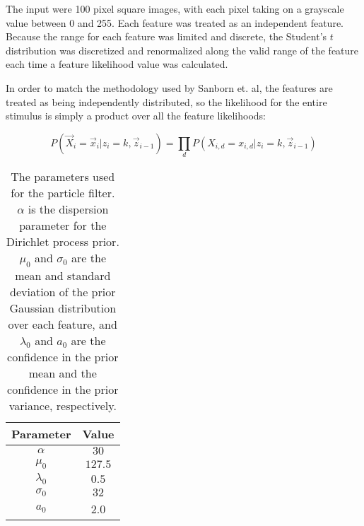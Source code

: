 The input were 100 pixel square images, with each pixel taking on a grayscale
value between 0 and 255. Each feature was treated as an independent feature.
Because the range for each feature was limited and discrete, the Student's $t$
distribution was discretized and renormalized along the valid range of the
feature each time a feature likelihood value was calculated. 

In order to match the methodology used by Sanborn et. al, the features are
treated as being independently distributed, so the likelihood for the entire
stimulus is simply a product over all the feature likelihoods:

\begin{equation}
P(\vec{X}_i = \vec{x}_i | z_i = k,  \vec{z}_{i-1}) =  \prod_d P(X_{i,d} =
x_{i,d} | z_i = k,  \vec{z}_{i-1})
\end{equation}



\begin{table}
\centering
\begin{tabular}{c | c}
Parameter & Value \\ \hline
$\alpha$ & $30$ \\
$\mu_0$ & $127.5$ \\
$\lambda_0$ & $0.5$ \\
$\sigma_0$ & $32$ \\
$a_0$ & 2.0 \\
\end{tabular}
\label{tab:parameters}
\caption{The parameters used for the particle filter. $\alpha$ is the dispersion
parameter for the Dirichlet process prior. $\mu_0$ and $\sigma_0$ are the mean
and standard deviation of the prior Gaussian distribution over each feature, and
$\lambda_0$ and $a_0$ are the confidence in the prior mean and the confidence in the
prior variance, respectively.}
\end{table}



